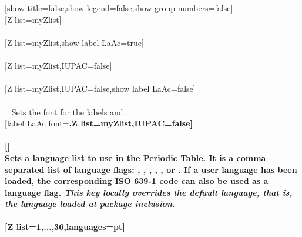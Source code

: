 \\ [5pt]%
%
\\ [-4pt][show title=false,show legend=false,show group numbers=false]%
\pgfPTstyle[show title=false,show legend=false,show group numbers=false]%
\\ [-4pt][Z list=myZlist]%
\\ [5pt]\makebox[\linewidth][c]{\scalebox{.6}{\pgfPT[Z list=myZlist]}}%
\\ [5pt][Z list=myZlist,show label LaAc=true]%
\\ [5pt]\makebox[\linewidth][c]{\scalebox{.6}{\pgfPT[Z list=myZlist,show label LaAc=true]}}%
\\ [5pt][Z list=myZlist,IUPAC=false]%
\\ [5pt]\makebox[\linewidth][c]{\scalebox{.6}{\pgfPT[Z list=myZlist,IUPAC=false]}}%
\\ [5pt][Z list=myZlist,IUPAC=false,show label LaAc=false]%
\\ [5pt]\makebox[\linewidth][c]{\scalebox{.6}{\pgfPT[Z list=myZlist,IUPAC=false,show label LaAc=false]}}%
\\ [5pt]\pgfPTendoption%
\newpage\vspace{-34pt}\ %
\label{option_label LaAc font}%
%
{Sets the font for the labels  and .}%
\\ [5pt][label LaAc font=\string\bfseries,Z list=myZlist,IUPAC=false]%
\\ [10pt]\makebox[\linewidth][c]{\scalebox{.6}{\pgfPT[label LaAc font=\bfseries,Z list=myZlist,IUPAC=false]}}%
\\ [5pt][]%
\pgfPTresetstyle%
\\ [-10pt]\pgfPTendoption%
\vfill
\label{option_languages}%
%
{Sets a language list to use in the Periodic Table. It is a comma separated list of language flags: , , , , ,  or . If a user language has been loaded, the corresponding ISO 639-1 code can also be used as a language flag. \textit{This key locally overrides the default language, that is, the language loaded at package inclusion}.\\ \ }%
\\ [5pt][Z list={1,...,36},languages=pt]%
